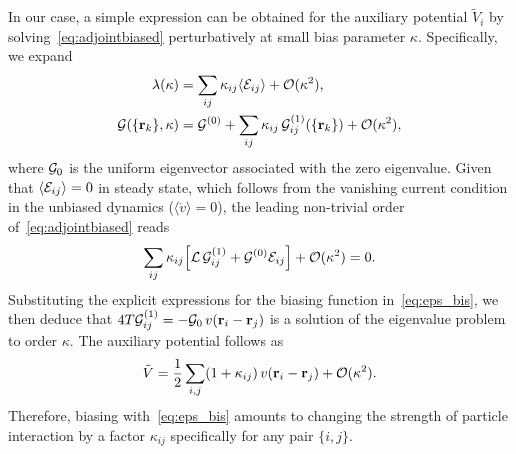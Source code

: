 \documentclass[superscriptaddress, twocolumn, prx, longbibliography, nofootinbib]{revtex4-1}
\begin{document}
In our case, a simple expression can be obtained for the auxiliary potential $\tilde V_i$ by solving~\eqref{eq:adjointbiased} perturbatively at small bias parameter $\kappa$. Specifically, we expand
\begin{equation}
	\begin{aligned}
		\lambda(\kappa) &= \sum_{ij} \kappa_{ij} \langle{\cal E}_{ij}\rangle + {\cal O}(\kappa^2) ,
		\\
		{\cal G}(\{{\bf r}_k\},\kappa) &= {\cal G}^{(0)} + \sum_{ij}\kappa_{ij}\,{\cal G}^{(1)}_{ij}(\{{\bf r}_k\}) + {\cal O}(\kappa^2) ,
	\end{aligned}
\end{equation}
where ${\cal G}_0$ is the uniform eigenvector associated with the zero eigenvalue. Given that $\langle{\cal E}_{ij}\rangle=0$ in steady state,  which follows from the vanishing current condition in the unbiased dynamics ($\langle\dot v\rangle=0$), the leading non-trivial order of~\eqref{eq:adjointbiased} reads
\begin{equation}\label{eq:eigenvalue}
	\sum_{ij} \kappa_{ij} \Big[ {\cal L}\, {\cal G}^{(1)}_{ij} + {\cal G}^{(0)} {\cal E}_{ij} \Big] + {\cal O}(\kappa^2) = 0 .
\end{equation}
Substituting the explicit expressions for the biasing function in~\eqref{eq:eps_bis}, we then deduce that $4T{\cal G}^{(1)}_{ij} = -{\cal G}_0\,v({\bf r}_i-{\bf r}_j)$ is a solution of the eigenvalue problem to order $\kappa$. The auxiliary potential follows as
\begin{equation}\label{eq:centralresult0}
	\tilde V = \frac{1}{2}\sum_{i,j} (1+\kappa_{ij})\, v({\bf r}_i-{\bf r}_j) + {\cal O}(\kappa^2) .
\end{equation}
Therefore, biasing with~\eqref{eq:eps_bis} amounts to changing the strength of particle interaction by a factor $\kappa_{ij}$ specifically for any pair $\{i,j\}$.
\end{document}

